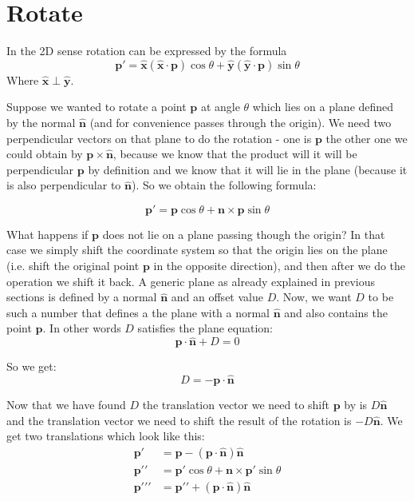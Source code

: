 \documentclass[]{report}   %
\begin{document}
\section{Rotate}


In the 2D sense rotation can be expressed by the formula
\[
	\mathbf{p\prime} = 
	\mathbf{\hat{x}}(\mathbf{\hat{x}} \cdot \mathbf{p})\cos\theta + \mathbf{\hat{y}}(\mathbf{\hat{y}} \cdot \mathbf{p})\sin\theta
\]
Where \(\mathbf{\hat{x}} \perp \mathbf{\hat{y}}\). 

Suppose we wanted to rotate a point \(\mathbf{p}\) at angle \(\theta\) which lies on a plane defined by the normal \(\mathbf{\hat{n}}\) (and for convenience passes through the origin). We need two perpendicular vectors on that plane to do the rotation - one is \(\mathbf{p}\) the other one we could obtain by \(\mathbf{p} \times \mathbf{\hat{n}}\), because we know that the product will it will be perpendicular \(\mathbf{p}\) by definition and we know that it will lie in the plane (because it is also perpendicular to \(\mathbf{\hat{n}}\)). So we obtain the following formula:
\begin{mdframed}
\[
	\mathbf{p\prime} = 
	\mathbf{p}\cos\theta + \mathbf{n}\times\mathbf{p}\sin\theta
\]
\end{mdframed}

What happens if \(\mathbf{p}\) does not lie on a plane passing though the origin? In that case we simply shift the coordinate system so that the origin lies on the plane (i.e. shift the original point \(\mathbf{p}\) in the opposite direction), and then after we do the operation we shift it back. A generic plane as already explained in previous sections is defined by a normal \(\mathbf{\hat{n}}\) and an offset value \(D\). 
Now, we want \(D\) to be such a number that defines a the plane with a normal \(\mathbf{\hat{n}}\) and also contains the point \(\mathbf{p}\). In other words \(D\) satisfies the plane equation:
\[
	\mathbf{p} \cdot \mathbf{\hat{n}} + D = 0
\]

So we get:
\[
	D = - \mathbf{p} \cdot \mathbf{\hat{n}}
\]

Now that we have found \(D\) the translation vector we need to shift \(\mathbf{p}\) by is \(D\mathbf{\hat{n}}\) and the translation vector we need to shift the result of the rotation is \(-D\mathbf{\hat{n}}\).
We get two translations which look like this:
\begin{align*}
	\mathbf{p\prime} &=  \mathbf{p}-(\mathbf{p}\cdot\mathbf{\hat{n}})\mathbf{\hat{n}} \\
	\mathbf{p\prime\prime} &= \mathbf{p\prime}\cos\theta+\mathbf{n}\times\mathbf{p\prime}\sin\theta	\\
	\mathbf{p\prime\prime\prime} &= \mathbf{p\prime\prime}+(\mathbf{p}\cdot\mathbf{\hat{n}})\mathbf{\hat{n}}
\end{align*}
\end{document}
